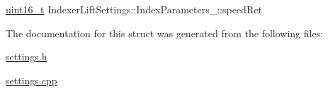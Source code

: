 \mbox{\label{structIndexerLiftSettings_1_1IndexParameters___af2b7b9756b272b7b60023be484749dad}} 
{\footnotesize\ttfamily \mbox{\hyperlink{settings_8h_a017dd44e68049ffdd31500a8cd01ba68}{uint16\+\_\+t}} Indexer\+Lift\+Settings\+::\+Index\+Parameters\+\_\+\+::\texorpdfstring{speed\+Ret}{speedRet}}



The documentation for this struct was generated from the following files\+:\begin{DoxyCompactItemize}
\item 
\mbox{\hyperlink{settings_8h}{settings.\+h}}\item 
\mbox{\hyperlink{settings_8cpp}{settings.\+cpp}}\end{DoxyCompactItemize}
\newpage